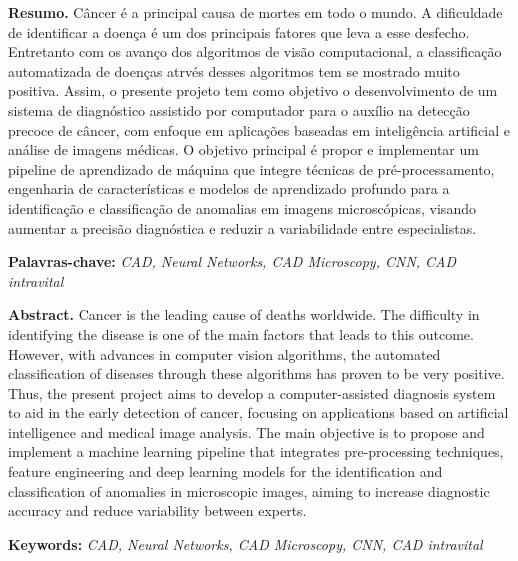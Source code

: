 \thispagestyle{plain}

\vspace{1.0cm}
   
\renewcommand{\baselinestretch}{0.6666666}
{\bf Resumo.} Câncer é a principal causa de mortes em todo o mundo. A dificuldade de identificar a doença é um dos principais fatores que leva a esse desfecho. Entretanto com os avanço dos algoritmos de visão computacional, a classificação automatizada de doenças atrvés desses algoritmos tem se mostrado muito positiva. Assim, o presente projeto tem como objetivo o desenvolvimento de um sistema de diagnóstico assistido por computador para o auxílio na detecção precoce de câncer, com enfoque em aplicações baseadas em inteligência artificial e análise de imagens médicas. O objetivo principal é propor e implementar um pipeline de aprendizado de máquina que integre técnicas de pré-processamento, engenharia de características e modelos de aprendizado profundo para a identificação e classificação de anomalias em imagens microscópicas, visando aumentar a precisão diagnóstica e reduzir a variabilidade entre especialistas.
\begin{flushleft}
{\bf Palavras-chave:} {\it CAD, Neural Networks, CAD Microscopy, CNN, CAD intravital}
\\[2.5cm]
\end{flushleft}


{\bf Abstract.} Cancer is the leading cause of deaths worldwide. The difficulty in identifying the disease is one of the main factors that leads to this outcome. However, with advances in computer vision algorithms, the automated classification of diseases through these algorithms has proven to be very positive. Thus, the present project aims to develop a computer-assisted diagnosis system to aid in the early detection of cancer, focusing on applications based on artificial intelligence and medical image analysis. The main objective is to propose and implement a machine learning pipeline that integrates pre-processing techniques, feature engineering and deep learning models for the identification and classification of anomalies in microscopic images, aiming to increase diagnostic accuracy and reduce variability between experts.
\begin{flushleft}
{\bf Keywords:} {\it CAD, Neural Networks, CAD Microscopy, CNN, CAD intravital}
\end{flushleft}
